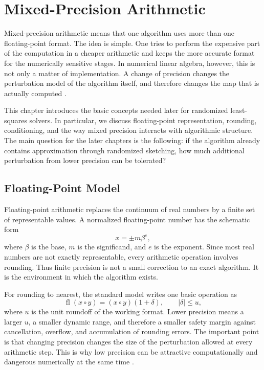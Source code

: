 \chapter{Mixed-Precision Arithmetic} \label{ch:mixedprecision}

Mixed-precision arithmetic means that one algorithm uses more than one
floating-point format. The idea is simple. One tries to perform the expensive part
of the computation in a cheaper arithmetic and keeps the more accurate format for
the numerically sensitive stages. In numerical linear algebra, however, this is not
only a matter of implementation. A change of precision changes the perturbation
model of the algorithm itself, and therefore changes the map that is actually
computed \cite{abdelfattah2021mixedsurvey,higham2022mixed}.

This chapter introduces the basic concepts needed later for randomized
least-squares solvers. In particular, we discuss floating-point representation,
rounding, conditioning, and the way mixed precision interacts with algorithmic
structure. The main question for the later chapters is the following: if the
algorithm already contains approximation through randomized sketching, how much
additional perturbation from lower precision can be tolerated?

\section{Floating-Point Model}

Floating-point arithmetic replaces the continuum of real numbers by a finite set of
representable values. A normalized floating-point number has the schematic form
\[
	x = \pm m\beta^e,
\]
where \(\beta\) is the base, \(m\) is the significand, and \(e\) is the exponent.
Since most real numbers are not exactly representable, every arithmetic operation
involves rounding. Thus finite precision is not a small correction to an exact
algorithm. It is the environment in which the algorithm exists.

For rounding to nearest, the standard model writes one basic operation as
\[
	\operatorname{fl}(x \circ y) = (x \circ y)(1+\delta), \qquad |\delta| \le u,
\]
where \(u\) is the unit roundoff of the working format. Lower precision means a
larger \(u\), a smaller dynamic range, and therefore a smaller safety margin against
cancellation, overflow, and accumulation of rounding errors. The important point
is that changing precision changes the size of the perturbation allowed at every
arithmetic step. This is why low precision can be attractive computationally and
dangerous numerically at the same time \cite{higham2022mixed,higham2023lowprecisions,carson2023habilitation}.

